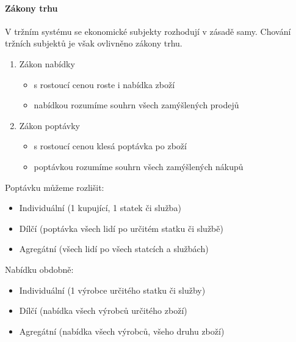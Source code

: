 \documentclass[11pt,a4paper,twoside]{book}
\begin{document}
\paragraph*{Zákony trhu}

V tržním systému se ekonomické subjekty rozhodují v zásadě samy. Chování tržních subjektů je však ovlivněno zákony trhu.

\begin{enumerate}
	\item Zákon nabídky
		\begin{itemize}
			\item s rostoucí cenou roste i nabídka zboží
			\item nabídkou rozumíme souhrn všech zamýšlených prodejů
		\end{itemize}
	\item Zákon poptávky
		\begin{itemize}
			\item s rostoucí cenou klesá poptávka po zboží
			\item poptávkou rozumíme souhrn všech zamýšlených nákupů
		\end{itemize}
\end{enumerate}

Poptávku můžeme rozlišit:
\begin{itemize}
	\item Individuální (1 kupující, 1 statek či služba)
	\item Dílčí (poptávka všech lidí po určitém statku či službě)
	\item Agregátní (všech lidí po všech statcích a službách)
\end{itemize}

Nabídku obdobně:
\begin{itemize}
	\item Individuální (1 výrobce určitého statku či služby)
	\item Dílčí (nabídka všech výrobců určitého zboží)
	\item Agregátní (nabídka všech výrobců, všeho druhu zboží)
\end{itemize}
\end{document}

